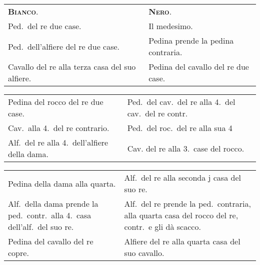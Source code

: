 \documentclass[11pt,a6paper]{article}
\begin{document}
{\small
\noindent
\begin{tabular}{@{}p{3.84cm}p{3.84cm}}
{\bfseries\scshape Bianco}.& {\bfseries\scshape Nero}.\\
Ped.\ del re due case. & Il medesimo.\\
Ped.\ dell'alfiere del re due case. &Pedina prende la pedina contraria.\\
Cavallo del re alla terza casa del suo alfiere. &Pedina del cavallo del re due case. \\
\end{tabular}

\noindent
\begin{tabular}{@{}p{3.84cm}p{3.84cm}}
Pedina del rocco del re due case. &Ped.\ del cav.\ del re alla 4.\ del cav.\ del re contr.\\
Cav.\ alla 4.\ del re contrario. &Ped.\ del roc.\ del re alla sua 4\\
Alf.\ del re alla 4.\ dell'alfiere della dama.&Cav. del re alla 3.\ case del rocco. \\
\end{tabular}

\noindent
\begin{tabular}{@{}p{3.84cm}p{3.84cm}}
Pedina della dama alla quarta.&Alf.\ del re alla seconda j casa del suo re.\\
Alf.\ della dama prende la ped.\ contr.\ alla 4.\ casa dell'alf.\ del suo re. &Alf.\ del re prende la ped.\ contraria, alla quarta casa del rocco del re, contr.\ e gli dà scacco. \\
Pedina del cavallo del re copre. & Alfiere del re alla quarta casa del suo cavallo.\\
\end{tabular}

}
\end{document}
